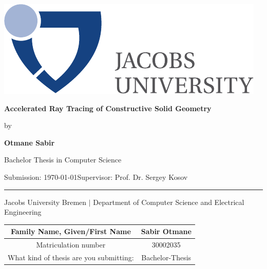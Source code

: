 \documentclass[a4paper,11pt,oneside]{article}
\newcommand{\myname}{Otmane Sabir}
\newcommand{\mytitle}{Accelerated Ray Tracing of Constructive Solid Geometry}
\newcommand{\mysupervisor}{Prof. Dr. Sergey Kosov}
\begin{document}

\thispagestyle{empty}

\begin{flushright}
	\includegraphics[scale=0.8]{bsc-logo}
\end{flushright}
\vspace*{40mm}
\begin{center}
	\huge
	\textbf{\mytitle}
\end{center}
\vspace*{4mm}
\begin{center}
	\Large by
\end{center}
\vspace*{4mm}
\begin{center}
	\LARGE
	\textbf{\myname}
\end{center}
\vspace*{20mm}
\begin{center}
	\Large
	Bachelor Thesis in Computer Science
\end{center}
\vfill
\begin{flushleft}
	\large
	Submission: \today \hfill Supervisor: \mysupervisor \\
	\rule{\textwidth}{1pt}
\end{flushleft}
\begin{center}
	Jacobs University Bremen $|$ Department of Computer Science and Electrical Engineering
\end{center}

\newpage
\thispagestyle{empty}

\begin{table}
	\begin{tabular}{|c | c|} 
		\hline
		Family Name, Given/First Name       & Sabir Otmane      \\
		\hline
		Matriculation number       & 30002035      \\
		\hline
		What kind of thesis are you submitting: & Bachelor-Thesis      \\		 
		\hline   	
	\end{tabular}
\end{table}
\end{document}

